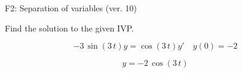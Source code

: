\begin{exercise}
  \begin{exerciseTitle}F2: Separation of variables (ver. 10)\end{exerciseTitle}
  \begin{exerciseStatement}
    
Find the solution to the given IVP.

    
\[-3 \, \sin\left(3 \, t\right) y= \cos\left(3 \, t\right) y'\hspace{1em} y\left( 0 \right)= -2\]

  \end{exerciseStatement}
  \begin{exerciseAnswer}
    
\[y= -2 \, \cos\left(3 \, t\right)\]

  \end{exerciseAnswer}
\end{exercise}